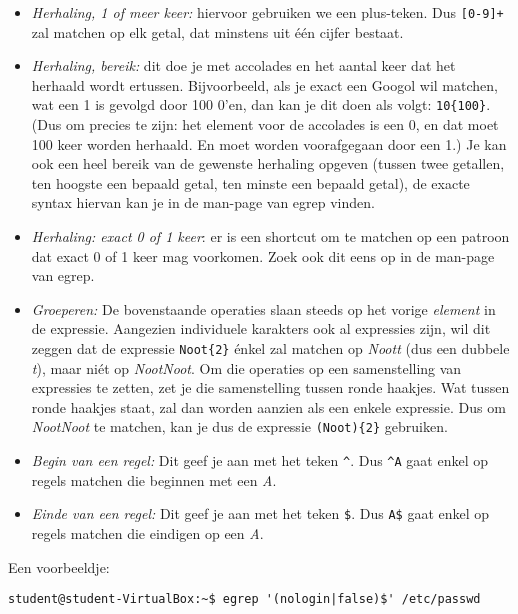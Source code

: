 \documentclass[a4paper,twoside,openany]{memoir}
\begin{document}
\begin{itemize}
  \item \emph{Herhaling, 1 of meer keer:} hiervoor gebruiken we een plus-teken.
    Dus \verb![0-9]+! zal matchen op elk getal, dat minstens uit \'e\'en cijfer
    bestaat.

  \item \emph{Herhaling, bereik:} dit doe je met accolades en het aantal keer
    dat het herhaald wordt ertussen. Bijvoorbeeld, als je exact een Googol wil
    matchen, wat een 1 is gevolgd door 100 0'en, dan kan je dit doen als volgt:
    \verb!10{100}!. (Dus om precies te zijn: het element voor de accolades is
    een 0, en dat moet 100 keer worden herhaald. En moet worden voorafgegaan
    door een 1.) Je kan ook een heel bereik van de gewenste herhaling
    opgeven (tussen twee getallen, ten hoogste een bepaald getal, ten
    minste een bepaald getal), de exacte
    syntax hiervan kan je in de man-page van egrep vinden.

  \item \emph{Herhaling: exact 0 of 1 keer}: er is een shortcut om te
    matchen op een patroon dat exact 0 of 1 keer mag voorkomen. Zoek
    ook dit eens op in de man-page van egrep.

  \item \emph{Groeperen:} De bovenstaande operaties slaan steeds op het vorige
    \emph{element} in de expressie. Aangezien individuele karakters ook al
    expressies zijn, wil dit zeggen dat de expressie \verb!Noot{2}! \'enkel zal
    matchen op \emph{Noott} (dus een dubbele \emph{t}), maar ni\'et op
    \emph{NootNoot}. Om die operaties op een samenstelling van expressies te
    zetten, zet je die samenstelling tussen ronde haakjes. Wat tussen ronde
    haakjes staat, zal dan worden aanzien als een enkele expressie. Dus om
    \emph{NootNoot} te matchen, kan je dus de expressie \verb!(Noot){2}!
    gebruiken.

  \item \emph{Begin van een regel:} Dit geef je aan met het teken \verb!^!. Dus
    \verb!^A! gaat enkel op regels matchen die beginnen met een \emph{A}.

  \item \emph{Einde van een regel:} Dit geef je aan met het teken \verb!$!. Dus
    \verb!A$! gaat enkel op regels matchen die eindigen op een \emph{A}.

\end{itemize}

Een voorbeeldje:

\begin{verbatim}
student@student-VirtualBox:~$ egrep '(nologin|false)$' /etc/passwd
\end{verbatim}
\end{document}
